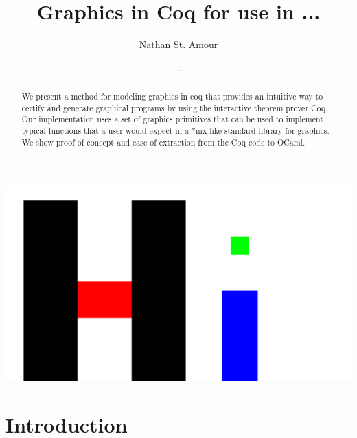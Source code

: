 \documentclass{llncs}
\begin{document}
\title{Graphics in Coq for use in ...}
\author{Nathan St. Amour \and ...}
\maketitle

\begin{abstract}
We present a method for modeling graphics in coq that provides an intuitive way to certify and generate graphical programs by using the interactive
theorem prover Coq.  Our implementation uses a set of graphics primitives that can be used to implement typical functions that a user would expect in a *nix like standard library for graphics.  We show proof of concept and ease of extraction from the Coq code to OCaml. 
\end{abstract}
\includegraphics[scale=.3]{hi.png}

\tableofcontents
\newpage

\section{Introduction}
\end{document}
